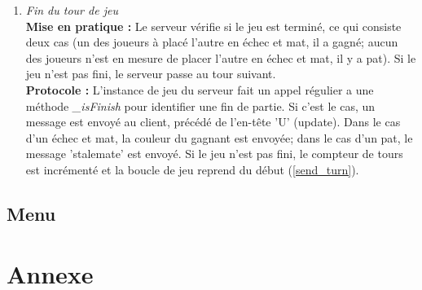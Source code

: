 \documentclass[10pt, a4paper]{article}
\begin{document}
\begin{enumerate}
\item \textit{Fin du tour de jeu} \\
\textbf{Mise en pratique :} Le serveur vérifie si le jeu est terminé, ce qui consiste deux cas (un des joueurs à placé l'autre en échec et mat, il a gagné; aucun des joueurs n'est en mesure de placer l'autre en échec et mat, il y a pat). Si le jeu n'est pas fini, le serveur passe au tour suivant.\\
\textbf{Protocole :} L'instance de jeu du serveur fait un appel régulier a une méthode \textit{\_isFinish} pour identifier une fin de partie. Si c'est le cas, un message est envoyé au client, précédé de l'en-tête 'U' (update). Dans le cas d'un échec et mat, la couleur du gagnant est envoyée; dans le cas d'un pat, le message 'stalemate' est envoyé. Si le jeu n'est pas fini, le compteur de tours est incrémenté et la boucle de jeu reprend du début (\ref{send_turn}).

\end{enumerate}

\subsection{Menu}

\section{Annexe}
\end{document}
